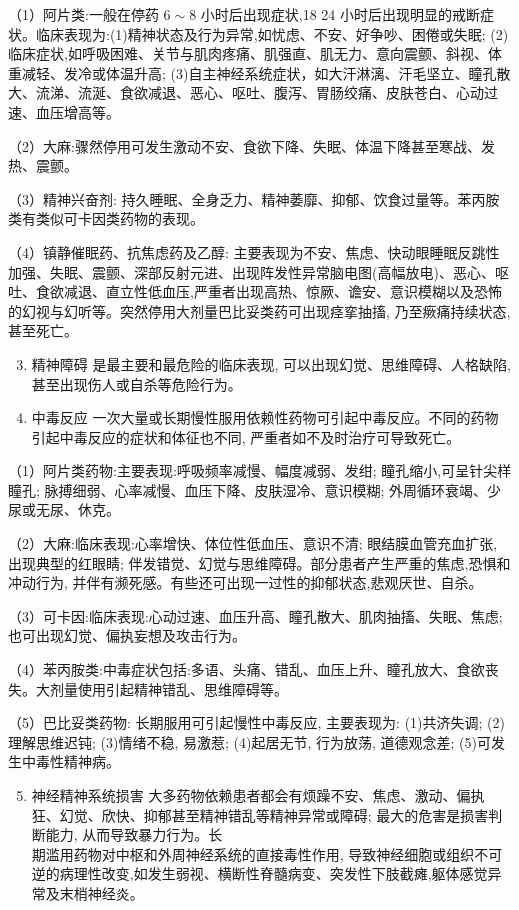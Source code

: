 \documentclass[10pt]{article}
\begin{document}
（1）阿片类:一般在停药 $6 \sim 8$ 小时后出现症状,18 24 小时后出现明显的戒断症状。临床表现为:(1)精神状态及行为异常,如忧虑、不安、好争吵、困倦或失眠; (2)临床症状,如呼吸困难、关节与肌肉疼痛、肌强直、肌无力、意向震颤、斜视、体重减轻、发冷或体温升高; (3)自主神经系统症状，如大汗淋漓、汗毛坚立、瞳孔散大、流涕、流涎、食欲减退、恶心、呕吐、腹泻、胃肠绞痛、皮肤苍白、心动过速、血压增高等。

（2）大麻:骤然停用可发生激动不安、食欲下降、失眠、体温下降甚至寒战、发热、震颤。

（3）精神兴奋剂: 持久睡眠、全身乏力、精神萎靡、抑郁、饮食过量等。苯丙胺类有类似可卡因类药物的表现。

（4）镇静催眠药、抗焦虑药及乙醇: 主要表现为不安、焦虑、快动眼睡眠反跳性加强、失眠、震颤、深部反射元进、出现阵发性异常脑电图(高幅放电)、恶心、呕吐、食欲减退、直立性低血压,严重者出现高热、惊厥、谵安、意识模糊以及恐怖的幻视与幻听等。突然停用大剂量巴比妥类药可出现痉挛抽搐, 乃至瘚痛持续状态,甚至死亡。

\begin{enumerate}
  \setcounter{enumi}{2}
  \item 精神障碍 是最主要和最危险的临床表现, 可以出现幻觉、思维障碍、人格缺陷, 甚至出现伤人或自杀等危险行为。

  \item 中毒反应 一次大量或长期慢性服用依赖性药物可引起中毒反应。不同的药物引起中毒反应的症状和体征也不同, 严重者如不及时治疗可导致死亡。

\end{enumerate}

（1）阿片类药物:主要表现:呼吸频率减慢、幅度减弱、发绀; 瞳孔缩小,可呈针尖样瞳孔; 脉搏细弱、心率减慢、血压下降、皮肤湿冷、意识模糊; 外周循环衰竭、少尿或无尿、休克。

（2）大麻:临床表现:心率增快、体位性低血压、意识不清; 眼结膜血管充血扩张, 出现典型的红眼睛; 伴发错觉、幻觉与思维障碍。部分患者产生严重的焦虑,恐惧和冲动行为, 并伴有濒死感。有些还可出现一过性的抑郁状态,悲观厌世、自杀。

（3）可卡因:临床表现:心动过速、血压升高、瞳孔散大、肌肉抽搐、失眠、焦虑; 也可出现幻觉、偏执妄想及攻击行为。

（4）苯丙胺类:中毒症状包括:多语、头痛、错乱、血压上升、瞳孔放大、食欲丧失。大剂量使用引起精神错乱、思维障碍等。

（5）巴比妥类药物: 长期服用可引起慢性中毒反应, 主要表现为: (1)共济失调; (2)理解思维迟钝; (3)情绪不稳, 易激惹; (4)起居无节, 行为放荡, 道德观念差; (5)可发生中毒性精神病。

\begin{enumerate}
  \setcounter{enumi}{4}
  \item 神经精神系统损害 大多药物依赖患者都会有烦躁不安、焦虑、激动、偏执狂、幻觉、欣快、抑郁甚至精神错乱等精神异常或障碍; 最大的危害是损害判断能力, 从而导致暴力行为。长\\
期滥用药物对中枢和外周神经系统的直接毒性作用, 导致神经细胞或组织不可逆的病理性改变,如发生弱视、横断性脊髓病变、突发性下肢截瘫,躯体感觉异常及末梢神经炎。
\end{enumerate}
\end{document}
